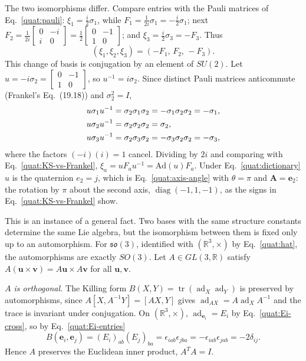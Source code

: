 The two isomorphisms differ. Compare entries with the Pauli matrices of
Eq.~\eqref{quat:pauli}: $\xi_1=\frac i2\sigma_1$, while
$F_1=\frac{1}{2i}\sigma_1=-\frac i2\sigma_1$; next
$F_2=\frac{1}{2i}\begin{bmatrix}0&-i\\i&0\end{bmatrix}
=\frac12\begin{bmatrix}0&-1\\1&0\end{bmatrix}$; and
$\xi_3=\frac i2\sigma_3=-F_3$. Thus
\begin{equation}\label{quat:KS-vs-Frankel}
 (\xi_1,\xi_2,\xi_3)=(-F_1,\,F_2,\,-F_3).
\end{equation}
This change of basis is conjugation by an element of $SU(2)$. Let
$u=-i\sigma_2=\begin{bmatrix}0&-1\\1&0\end{bmatrix}$, so $u^{-1}=i\sigma_2$.
Since distinct Pauli matrices anticommute (Frankel's Eq.~(19.18)) and
$\sigma_2^2=I$,
\begin{align}
 u\sigma_1u^{-1}&=\sigma_2\sigma_1\sigma_2=-\sigma_1\sigma_2\sigma_2=-\sigma_1,\notag\\
 u\sigma_2u^{-1}&=\sigma_2\sigma_2\sigma_2=\sigma_2,\notag\\
 u\sigma_3u^{-1}&=\sigma_2\sigma_3\sigma_2=-\sigma_3\sigma_2\sigma_2=-\sigma_3 ,
 \label{quat:conjugate-by-j}
\end{align}
where the factors $(-i)(i)=1$ cancel. Dividing by $2i$ and comparing with
Eq.~\eqref{quat:KS-vs-Frankel},
$\xi_a=uF_au^{-1}=\mathrm{Ad}(u)F_a$. Under
Eq.~\eqref{quat:dictionary} $u$ is the quaternion $e_2=j$, which is
Eq.~\eqref{quat:axis-angle} with $\theta=\pi$ and $\mathbf A=\mathbf e_2$:
the rotation by $\pi$ about the second axis,
$\operatorname{diag}(-1,1,-1)$, as the signs in
Eq.~\eqref{quat:KS-vs-Frankel} show.

This is an instance of a general fact. Two bases with the same structure
constants determine the same Lie algebra, but the isomorphism between them
is fixed only up to an automorphism. For $\mathfrak{so}(3)$, identified
with $(\mathbb R^3,\times)$ by Eq.~\eqref{quat:hat}, the automorphisms are
exactly $SO(3)$. Let $A\in GL(3,\mathbb R)$ satisfy
$A(\mathbf u\times\mathbf v)=A\mathbf u\times A\mathbf v$ for all
$\mathbf u,\mathbf v$.

\emph{$A$ is orthogonal.} The Killing form $B(X,Y)=\operatorname{tr}
(\operatorname{ad}_X\operatorname{ad}_Y)$ is preserved by automorphisms,
since $A[X,A^{-1}Y]=[AX,Y]$ gives
$\operatorname{ad}_{AX}=A\operatorname{ad}_XA^{-1}$ and the trace is
invariant under conjugation. On $(\mathbb R^3,\times)$,
$\operatorname{ad}_{\mathbf e_i}=E_i$ by Eq.~\eqref{quat:Ei-cross}, so by
Eq.~\eqref{quat:Ei-entries}
\begin{equation}
 B(\mathbf e_i,\mathbf e_j)=(E_i)_{ab}(E_j)_{ba}
 =\epsilon_{iab}\epsilon_{jba}=-\epsilon_{iab}\epsilon_{jab}=-2\delta_{ij}.
\end{equation}
Hence $A$ preserves the Euclidean inner product, $A^TA=I$.

